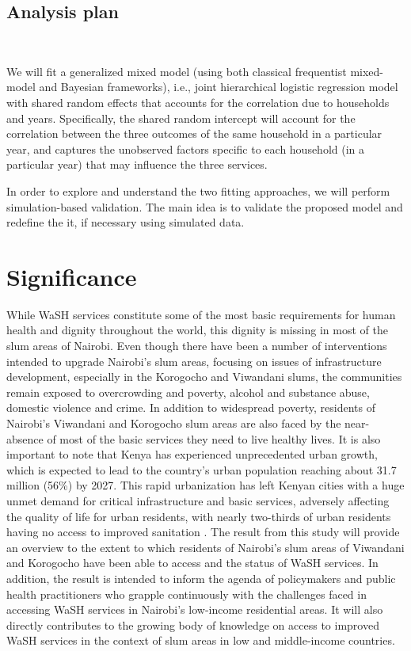 \subsection{Analysis plan}

~

We will fit a generalized mixed model (using both classical frequentist mixed-model and Bayesian frameworks), i.e., joint hierarchical logistic regression model with shared random effects that accounts for the correlation due to households and years. Specifically, the shared random intercept will account for the correlation between the three outcomes of the same household in a particular year, and captures the unobserved factors specific to each household (in a particular year) that may influence the three services.

In order to explore and understand the two fitting approaches, we will perform simulation-based validation.  The main idea is to validate the proposed model and redefine the it, if necessary using simulated data.

\section{Significance}

While WaSH services constitute some of the most basic requirements for human health and dignity throughout the world, this dignity is missing in most of the slum areas of Nairobi. Even though there have been a number of interventions intended to upgrade Nairobi's slum areas, focusing on issues of infrastructure development, especially in the Korogocho and Viwandani slums, the communities remain exposed to overcrowding and poverty, alcohol and substance abuse, domestic violence and crime. In addition to widespread poverty, residents of Nairobi's Viwandani and Korogocho slum areas are also faced by the near-absence of most of the basic services they need to live healthy lives. It is also important to note that Kenya has experienced unprecedented urban growth, which is expected to lead to the country's urban population reaching about 31.7 million (56\%) by 2027. This rapid urbanization has left Kenyan cities with a huge unmet demand for critical infrastructure and basic services, adversely affecting the quality of life for urban residents, with nearly two-thirds of urban residents having no access to improved sanitation \citep{chikozho2019leaving}. The result from this study will provide an overview to the extent to which residents of Nairobi's slum areas of Viwandani and Korogocho have been able to access and the status of WaSH services. In addition, the result is intended to inform the agenda of policymakers and public health practitioners who grapple continuously with the challenges faced in accessing WaSH services in Nairobi's low-income residential areas. It will also directly contributes to the growing body of knowledge on access to improved WaSH services in the context of slum areas in low and middle-income countries.

